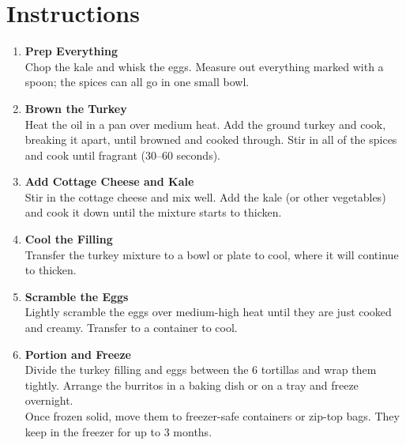 \newpage
{}
\section*{Instructions}

\begin{enumerate}

      \item \textbf{Prep Everything} \\
            Chop the kale and whisk the eggs. Measure out everything marked with a spoon; the spices can all go in one small bowl.

      \item \textbf{Brown the Turkey} \\
            Heat the oil in a pan over medium heat. Add the ground turkey and cook, breaking it apart, until browned and cooked through. Stir in all of the spices and cook until fragrant (30--60 seconds).

      \item \textbf{Add Cottage Cheese and Kale} \\
            Stir in the cottage cheese and mix well. Add the kale (or other vegetables) and cook it down until the mixture starts to thicken.

      \item \textbf{Cool the Filling} \\
            Transfer the turkey mixture to a bowl or plate to cool, where it will continue to thicken.

      \item \textbf{Scramble the Eggs} \\
            Lightly scramble the eggs over medium-high heat until they are just cooked and creamy. Transfer to a container to cool.

      \item \textbf{Portion and Freeze} \\
            Divide the turkey filling and eggs between the 6 tortillas and wrap them tightly. Arrange the burritos in a baking dish or on a tray and freeze overnight. \\
            Once frozen solid, move them to freezer-safe containers or zip-top bags. They keep in the freezer for up to 3 months.

\end{enumerate}



